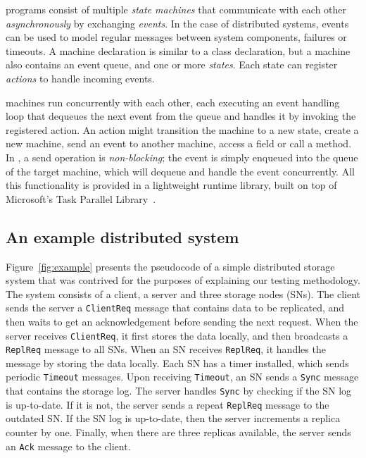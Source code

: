 \psharp programs consist of multiple \emph{state machines} that communicate with each other \emph{asynchronously} by exchanging \emph{events}. In the case of distributed systems, \psharp events can be used to model regular messages between system components, failures or timeouts. A \psharp machine declaration is similar to a \csharp class declaration, but a machine also contains an event queue, and one or more \emph{states}. Each state can register \emph{actions} to handle incoming events.

\psharp machines run concurrently with each other, each executing an event handling loop that dequeues the next event from the queue and handles it by invoking the registered action. An action might transition the machine to a new state, create a new machine, send an event to another machine, access a field or call a method. In \psharp, a send operation is \emph{non-blocking}; the event is simply enqueued into the queue of the target machine, which will dequeue and handle the event concurrently. All this functionality is provided in a lightweight runtime library, built on top of Microsoft's Task Parallel Library~\cite{leijen2009tpl}.

\vspace{-2mm}
\subsection{An example distributed system}
\label{sec:overview:example}

Figure~\ref{fig:example} presents the pseudocode of a simple distributed storage system that was contrived for the purposes of explaining our testing methodology. The system consists of a client, a server and three storage nodes (SNs). The client sends the server a \texttt{ClientReq} message that contains data to be replicated, and then waits to get an acknowledgement before sending the next request. When the server receives \texttt{ClientReq}, it first stores the data locally, and then broadcasts a \texttt{ReplReq} message to all SNs. When an SN receives \texttt{ReplReq}, it handles the message by storing the data locally. Each SN has a timer installed, which sends periodic \texttt{Timeout} messages. Upon receiving \texttt{Timeout}, an SN sends a \texttt{Sync} message that contains the storage log. The server handles \texttt{Sync} by checking if the SN log is up-to-date. If it is not, the server sends a repeat \texttt{ReplReq} message to the outdated SN. If the SN log is up-to-date, then the server increments a replica counter by one. Finally, when there are three replicas available, the server sends an \texttt{Ack} message to the client.

